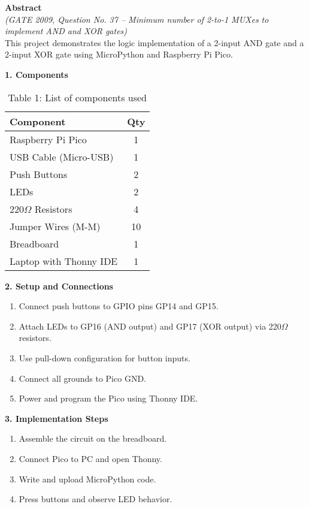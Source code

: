 \documentclass[12pt]{article}
\begin{document}
\begin{multicols}{2}

\noindent\textbf{Abstract} \\[0.5em]
\textit{(GATE 2009, Question No. 37 – Minimum number of 2-to-1 MUXes to implement AND and XOR gates)} \\[0.5em]
This project demonstrates the logic implementation of a 2-input AND gate and a 2-input XOR gate using MicroPython and Raspberry Pi Pico.

\vspace{1em}
\noindent\textbf{1. Components}
\begin{table}[H]
\small
\centering
\begin{tabular}{|p{4.2cm}|c|}
\hline
\textbf{Component} & \textbf{Qty} \\
\hline
Raspberry Pi Pico & 1 \\
USB Cable (Micro-USB) & 1 \\
Push Buttons & 2 \\
LEDs & 2 \\
220$\Omega$ Resistors & 4 \\
Jumper Wires (M-M) & 10 \\
Breadboard & 1 \\
Laptop with Thonny IDE & 1 \\
\hline
\end{tabular}
\caption*{Table 1: List of components used}
\end{table}

\vspace{1em}
\noindent\textbf{2. Setup and Connections}
\begin{enumerate}
    \item Connect push buttons to GPIO pins GP14 and GP15.
    \item Attach LEDs to GP16 (AND output) and GP17 (XOR output) via 220$\Omega$ resistors.
    \item Use pull-down configuration for button inputs.
    \item Connect all grounds to Pico GND.
    \item Power and program the Pico using Thonny IDE.
\end{enumerate}

\vspace{1em}
\noindent\textbf{3. Implementation Steps}
\begin{enumerate}
    \item Assemble the circuit on the breadboard.
    \item Connect Pico to PC and open Thonny.
    \item Write and upload MicroPython code.
    \item Press buttons and observe LED behavior.
\end{enumerate}


\end{multicols}
\end{document}
